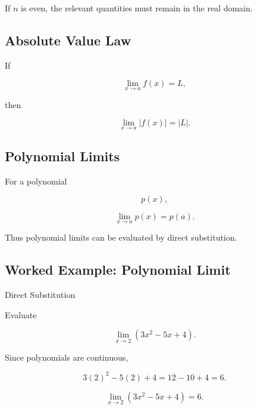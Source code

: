If \(n\) is even, the relevant quantities must remain in the real domain.

\subsection{Absolute Value Law}
\label{subsec:absolute-value-limit-law}

If

\[
\lim_{x\to a}f(x)=L,
\]

then

\[
\boxed{
\lim_{x\to a}|f(x)|
=
|L|.
}
\]

\subsection{Polynomial Limits}
\label{subsec:polynomial-limit-reference}

For a polynomial

\[
p(x),
\]

\[
\boxed{
\lim_{x\to a}p(x)
=
p(a).
}
\]

Thus polynomial limits can be evaluated by direct substitution.

\subsection{Worked Example: Polynomial Limit}
\label{subsec:worked-polynomial-limit}

\begin{workedexamplebox}{Direct Substitution}

Evaluate

\[
\lim_{x\to2}
(3x^2-5x+4).
\]

Since polynomials are continuous,

\[
3(2)^2-5(2)+4
=
12-10+4
=
6.
\]

\begin{answerbox}
\[
\boxed{
\lim_{x\to2}
(3x^2-5x+4)
=
6.
}
\]
\end{answerbox}

\end{workedexamplebox}


